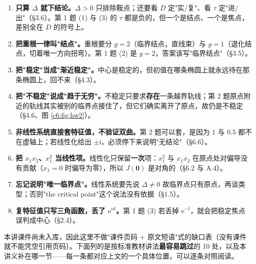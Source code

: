 \documentclass[11pt]{ctexart}
\newcommand{\Jac}{J}
\begin{document}
\begin{enumerate}
\item \textbf{只算 $\Delta$ 就下结论。}$\Delta>0$ 只排除鞍点；还要看 $D$ 定"实/复"、看 $\tau$ 定"进/出"（§3.6）。第 1 题 (1) 与 (3) 的 $\tau$ 都是负的，但一个是结点、一个是焦点，差别全在 $D$ 的符号上。
\item \textbf{把重根一律叫"结点"。}重根要分 $g=2$（临界结点，直线束）与 $g=1$（退化结点，切着唯一方向拐弯）。第 1 题 (2) 是 $g=2$，答案该写"临界结点"（§3.5）。
\item \textbf{把"稳定"当成"渐近稳定"。}中心是稳定的，但初值在哪条椭圆上就永远待在那条椭圆上，回不来（§4.3）。
\item \textbf{把"不稳定"说成"趋于无穷"。}不稳定只要求\textbf{存在}一条越界轨线；第 2 题原点附近的轨线其实被别的临界点接住了，但它们确实离开了原点，故仍是不稳定（§4.6、图 \ref{c6:fig:hw2}）。
\item \textbf{非线性系统直接套特征值，不验证双曲。}第 2 题可以套，是因为 $1$ 与 $0.5$ 都不在虚轴上；若线性化给出 $\pm\mathrm{i}$，必须停下来说明"无结论"（§6.6）。
\item \textbf{把 $x_1x_2$、$x_1^{2}$ 当线性项。}线性化只保留\textbf{一次}项：$x_1^{2}$ 与 $x_1x_2$ 在原点处对偏导没有贡献（$x_1=0$ 时偏导为零），所以 $\Jac(\mathbf{0})$ 是对角的（§6.2 与 A.4）。
\item \textbf{忘记说明"唯一临界点"。}线性系统要先说 $\Delta\neq0$ 故临界点只有原点，再谈类型；否则"the critical point"这个说法没有依据（§1.5）。
\item \textbf{复特征值只写三角函数，丢了 $\mathrm{e}^{\alpha t}$。}第 1 题 (3) 若丢掉 $\mathrm{e}^{-t}$，就会把稳定焦点误判成中心（§2.4）。
\end{enumerate}


本讲课件尚未入库，因此这里不做"课件页码 + 原文短语"式的缺口表（没有课件就不能凭空引用页码）。下面列的是按标准教材讲法\textbf{最容易跳过}的 10 处，以及本讲义补在哪一节——每一条都对应上文的一个具体位置，可以逐条对照阅读。
\end{document}
